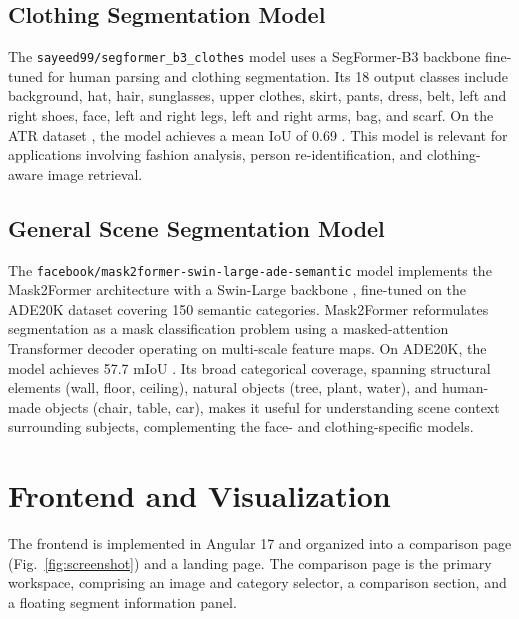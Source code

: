 \documentclass[conference,a4paper,flushend]{iaria}
\begin{document}
\subsection{Clothing Segmentation Model}

The \texttt{sayeed99/segformer\_b3\_clothes} \cite{afridi2023segformerb3} model uses a SegFormer-B3 \cite{xie2021segformersimpleefficientdesign} backbone fine-tuned for human parsing and clothing segmentation. Its 18 output classes include background, hat, hair, sunglasses, upper clothes, skirt, pants, dress, belt, left and right shoes, face, left and right legs, left and right arms, bag, and scarf. On the ATR dataset \cite{liang2015humanparsingwith}, the model achieves a mean IoU of 0.69 \cite{afridi2023segformerb3}. This model is relevant for applications involving fashion analysis, person re-identification, and clothing-aware image retrieval.

\subsection{General Scene Segmentation Model}

The \texttt{facebook/mask2former-swin-large-ade-}\allowbreak\texttt{semantic} \cite{cheng2022maskedattentionmasktransformeruniversal} model implements the Mask2Former architecture with a Swin-Large backbone \cite{liu2021swintransformerhierarchicalvision}, fine-tuned on the ADE20K dataset \cite{zhou2017sceneparsing} covering 150 semantic categories. Mask2Former reformulates segmentation as a mask classification problem using a masked-attention Transformer decoder operating on multi-scale feature maps. On ADE20K, the model achieves 57.7 mIoU \cite{cheng2022maskedattentionmasktransformeruniversal}. Its broad categorical coverage, spanning structural elements (wall, floor, ceiling), natural objects (tree, plant, water), and human-made objects (chair, table, car), makes it useful for understanding scene context surrounding subjects, complementing the face- and clothing-specific models.

\section{Frontend and Visualization}
\label{sec:ui}

The frontend is implemented in Angular 17 \cite{angular2023} and organized into a comparison page (Fig.~\ref{fig:screenshot}) and a landing page. %
The comparison page is the primary workspace, comprising an image and category selector, a comparison section, and a floating segment information panel.
\end{document}
